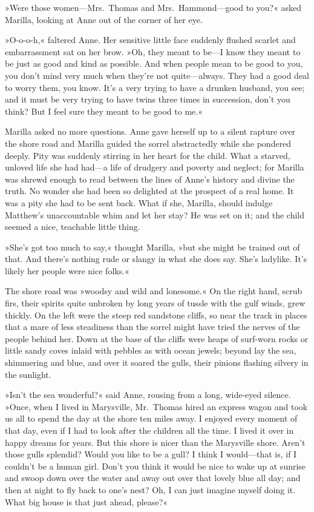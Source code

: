 »Were those women—Mrs.~Thomas and Mrs.~Hammond—good to you?« asked Marilla, looking at Anne out of the corner of her eye.

»O-o-o-h,« faltered Anne. Her sensitive little face suddenly flushed scarlet and embarrassment sat on her brow. »Oh, they meant to be—I know they meant to be just as good and kind as possible. And when people mean to be good to you, you don't mind very much when they're not quite—always. They had a good deal to worry them, you know. It's a very trying to have a drunken husband, you see; and it must be very trying to have twins three times in succession, don't you think? But I feel sure they meant to be good to me.«

Marilla asked no more questions. Anne gave herself up to a silent rapture over the shore road and Marilla guided the sorrel abstractedly while she pondered deeply. Pity was suddenly stirring in her heart for the child. What a starved, unloved life she had had—a life of drudgery and poverty and neglect; for Marilla was shrewd enough to read between the lines of Anne's history and divine the truth. No wonder she had been so delighted at the prospect of a real home. It was a pity she had to be sent back. What if she, Marilla, should indulge Matthew's unaccountable whim and let her stay? He was set on it; and the child seemed a nice, teachable little thing.

»She's got too much to say,« thought Marilla, »but she might be trained out of that. And there's nothing rude or slangy in what she does say. She's ladylike. It's likely her people were nice folks.«

The shore road was »woodsy and wild and lonesome.« On the right hand, scrub firs, their spirits quite unbroken by long years of tussle with the gulf winds, grew thickly. On the left were the steep red sandstone cliffs, so near the track in places that a mare of less steadiness than the sorrel might have tried the nerves of the people behind her. Down at the base of the cliffs were heaps of surf-worn rocks or little sandy coves inlaid with pebbles as with ocean jewels; beyond lay the sea, shimmering and blue, and over it soared the gulls, their pinions flashing silvery in the sunlight.

»Isn't the sea wonderful?« said Anne, rousing from a long, wide-eyed silence. »Once, when I lived in Marysville, Mr.~Thomas hired an express wagon and took us all to spend the day at the shore ten miles away. I enjoyed every moment of that day, even if I had to look after the children all the time. I lived it over in happy dreams for years. But this shore is nicer than the Marysville shore. Aren't those gulls splendid? Would you like to be a gull? I think I would—that is, if I couldn't be a human girl. Don't you think it would be nice to wake up at sunrise and swoop down over the water and away out over that lovely blue all day; and then at night to fly back to one's nest? Oh, I can just imagine myself doing it. What big house is that just ahead, please?«

